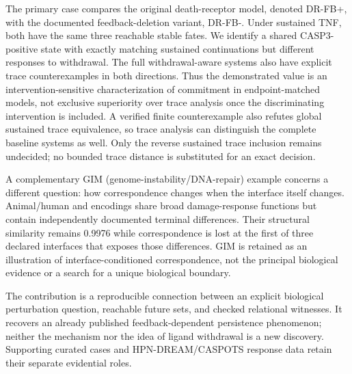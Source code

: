 The primary case compares the original death-receptor model, denoted DR-FB+,
with the documented feedback-deletion variant, DR-FB-. Under sustained TNF,
both have the same three reachable stable fates. We identify a shared
CASP3-positive state with exactly matching sustained continuations but different
responses to withdrawal. The full withdrawal-aware systems also have explicit
trace counterexamples in both directions. Thus the demonstrated value is an
intervention-sensitive characterization of commitment in endpoint-matched
models, not exclusive superiority over trace analysis once the discriminating
intervention is included. A verified finite counterexample also refutes global
sustained trace equivalence, so trace analysis can distinguish the complete
baseline systems as well. Only the reverse sustained trace inclusion remains
undecided; no bounded trace distance is substituted for an exact decision.

A complementary GIM (genome-instability/DNA-repair) example concerns a different
question: how correspondence changes when the interface itself changes.
Animal/human and \tas{} encodings share broad damage-response functions but
contain independently documented terminal differences.\cite{JacksonBartek2009,
BlackfordJackson2017,Yoshiyama2013,DeSchutter2007,Yi2014,Adachi2011}
Their structural similarity remains 0.9976 while correspondence is lost at the
first of three declared interfaces that exposes those differences. GIM is
retained as an illustration of interface-conditioned correspondence, not the
principal biological evidence or a search for a unique biological boundary.

The contribution is a reproducible connection between an explicit biological
perturbation question, reachable future sets, and checked relational witnesses.
It recovers an already published feedback-dependent persistence phenomenon;
neither the mechanism nor the idea of ligand withdrawal is a new discovery.
Supporting curated cases and HPN-DREAM/CASPOTS response data retain their
separate evidential roles.\cite{Hill2016,Razzaq2018}
